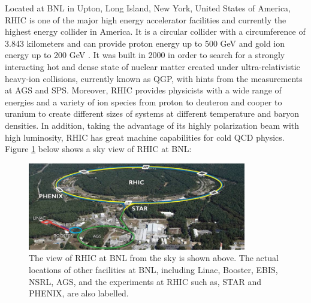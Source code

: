 Located at BNL in Upton, Long Island, New York, United States of America, RHIC is one of the major high energy accelerator facilities and currently the highest energy collider in America. It is a circular collider with a circumference of 3.843 kilometers and can provide proton energy up to 500 GeV and gold ion energy up to 200 GeV \cite{RHICReport}. It was built in 2000 in order to search for a strongly interacting hot and dense state of nuclear matter created under ultra-relativistic heavy-ion collisions, currently known as QGP, with hints from the measurements at AGS and SPS. Moreover, RHIC provides physicists with a wide range of energies and a variety of ion species from proton to deuteron and cooper to uranium to create different sizes of systems at different temperature and baryon densities. In addition, taking the advantage of its highly polarization beam with high luminosity, RHIC has great machine capabilities for cold QCD physics. Figure \ref{RHIC} below shows a sky view of RHIC at BNL:


\begin{figure}[hbtp]
\begin{center}
\includegraphics[width=0.85\textwidth]{Figures/Chapter1/RHIC.jpg}
\caption{The view of RHIC at BNL from the sky is shown above. The actual locations of other facilities at BNL, including Linac, Booster, EBIS, NSRL, AGS, and the experiments at RHIC such as, STAR and PHENIX, are also labelled.}
\label{RHIC}
\end{center}
\end{figure} 

